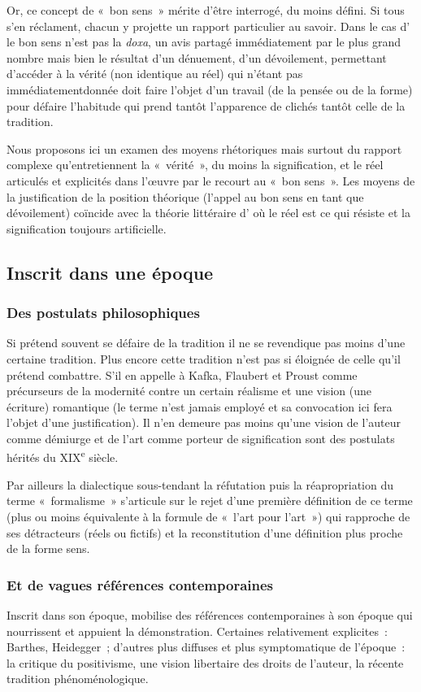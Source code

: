 \documentclass[12pt, a4paper]{article}
\begin{document}
    Or, ce concept de «~bon sens~» mérite d'être interrogé, du moins défini. Si tous s'en réclament, chacun y projette un rapport particulier au savoir. Dans le cas d'\robbe{} le bon sens n'est pas la \textit{doxa}, un avis partagé immédiatement par le plus grand nombre mais bien le résultat d'un dénuement, d'un dévoilement, permettant d'accéder à la vérité (non identique au réel) qui n'étant pas immédiatementdonnée doit faire l'objet d'un travail (de la pensée ou de la forme) pour défaire l'habitude qui prend tantôt l'apparence de clichés tantôt celle de la tradition.

    Nous proposons ici un examen des moyens rhétoriques mais surtout du rapport complexe qu'entretiennent la «~vérité~», du moins la signification, et le réel articulés et explicités dans l'œuvre par le recourt au «~bon sens~». Les moyens de la justification de la position théorique (l'appel au bon sens en tant que dévoilement) coïncide avec la théorie littéraire d'\robbe{} où le réel est ce qui résiste et la signification toujours artificielle.
\subsection{Inscrit dans une époque}
    \subsubsection{Des postulats philosophiques}
    Si \robbe{} prétend souvent se défaire de la tradition il ne se revendique pas moins d'une certaine tradition. Plus encore cette tradition n'est pas si éloignée de celle qu'il prétend combattre. S'il en appelle à Kafka, Flaubert et Proust comme précurseurs de la modernité contre un certain réalisme et une vision (une écriture) romantique (le terme n'est jamais employé et sa convocation ici fera l'objet d'une justification). Il n'en demeure pas moins qu'une vision de l'auteur comme démiurge et de l'art comme porteur de signification sont des postulats hérités du XIX\textsuperscript{e} siècle.

    Par ailleurs la dialectique sous-tendant la réfutation puis la réapropriation du terme «~formalisme~» s'articule sur le rejet d'une première définition de ce terme (plus ou moins équivalente à la formule de «~l'art pour l'art~») qui rapproche \robbe{} de ses détracteurs (réels ou fictifs) et la reconstitution d'une définition plus proche de la forme sens.
    \subsubsection{Et de vagues références contemporaines}
    Inscrit dans son époque, \punr{} mobilise des références contemporaines à son époque qui nourrissent et appuient la démonstration. Certaines relativement explicites~: Barthes, Heidegger~; d'autres plus diffuses et plus symptomatique de l'époque~: la critique du positivisme, une vision libertaire des droits de l'auteur, la récente tradition phénoménologique.
\end{document}
